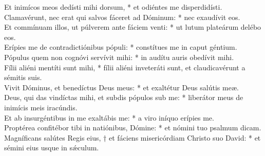 {	Et inimícos meos dedísti mihi dorsum, * et odiéntes me disperdidísti. \\
	Clamavérunt, nec erat qui salvos fáceret ad Dóminum: * nec exaudívit eos. \\
	Et commínuam illos, ut púlverem ante fáciem venti: * ut lutum plateárum delébo eos. \\
	Erípies me de contradictiónibus pópuli: * constítues me in caput géntium. \\
	Pópulus quem non cognóvi servívit mihi: * in audítu auris obedívit mihi. \\
	Fílii aliéni mentíti sunt mihi, * fílii aliéni inveteráti sunt, et claudicavérunt a sémitis suis. \\
	Vivit Dóminus, et benedíctus Deus meus: * et exaltétur Deus salútis meæ. \\
	Deus, qui das vindíctas mihi, et subdis pópulos sub me: * liberátor meus de inimícis meis iracúndis. \\
	Et ab insurgéntibus in me exaltábis me: * a viro iníquo erípies me. \\
	Proptérea confitébor tibi in natiónibus, Dómine: * et nómini tuo psalmum dicam. \\
	Magníficans salútes Regis eius, † et fáciens misericórdiam Christo suo David: * et sémini eius usque in sǽculum. \\
}

